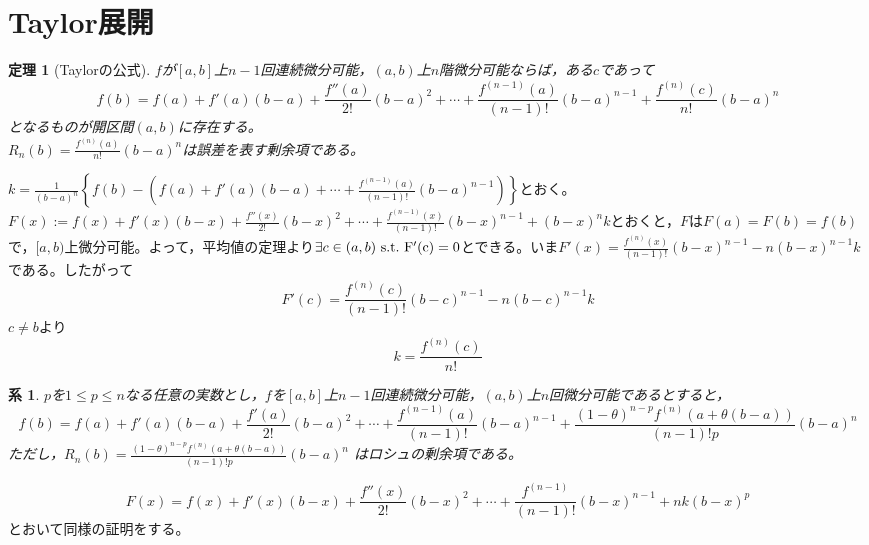 \documentclass[dvipdfmx,a4j,10pt]{jsarticle}
\makeatletter
\theoremstyle{mystyle1}
\newtheorem{thm}[dfn]{定理}
\newtheorem{cor}[dfn]{系}
\theoremstyle{mystyle2}
\renewenvironment{proof}[1][\proofname]{\par
  \pushQED{\qed}%
  \normalfont
  \topsep6\p@\@plus6\p@ \trivlist
  \item[\hskip\labelsep{\bfseries\sffamily #1}]\ignorespaces
}{%
  \popQED\endtrivlist\@endpefalse
}
\renewcommand\proofname{証明}
\makeatother
\begin{document}
\newpage

\section{Taylor展開}

\begin{framed}
\begin{thm}[Taylorの公式]\label{thm8.1}
$f$が$[a,b]$上$n-1$回連続微分可能，$(a,b)$上$n$階微分可能ならば，ある$c$であって
\[
f(b)=f(a)+f'(a)(b-a)+\frac{f''(a)}{2!}(b-a)^2+\cdots+\frac{f^{(n-1)}(a)}{(n-1)!}(b-a)^{n-1}+\frac{f^{(n)}(c)}{n!}(b-a)^n
\]
となるものが開区間$(a,b)$に存在する。\\
$\displaystyle R_n(b)= \frac{f^{(n)}(a)}{n!}(b-a)^n $は誤差を表す剰余項である。
\end{thm}
\end{framed}

\begin{proof}[定理\ref{thm8.1}の証明]
    $\displaystyle k=\frac{1}{(b-a)^n}\left\{f(b)-\left(f(a)+f'(a)(b-a)+\cdots+\frac{f^{(n-1)}(a)}{(n-1)!}(b-a)^{n-1}\right)\right\}$とおく。$\displaystyle F(x):=f(x)+f'(x)(b-x)+\frac{f''(x)}{2!}(b-x)^2+\cdots+\frac{f^{(n-1)}(x)}{(n-1)!}(b-x)^{n-1}+(b-x)^nk$とおくと，$F$は$F(a)=F(b)=f(b)$で，$[a,b)$上微分可能。よって，平均値の定理より$\exists c\in (a,b)\rm{\ s.t.\ }F'(c)=0$とできる。いま$\displaystyle F'(x)=\frac{f^{(n)}(x)}{(n-1)!}(b-x)^{n-1}-n(b-x)^{n-1}k$である。したがって
    \[
    F'(c)=\frac{f^{(n)}(c)}{(n-1)!}(b-c)^{n-1}-n(b-c)^{n-1}k
    \]
    $c\neq b$より
    \[
    k=\frac{f^{(n)}(c)}{n!}
    \]
\end{proof}

\begin{framed}
    \begin{cor}\label{cor8.2}
        $p$を$1\leq p\leq n$なる任意の実数とし，$f$を$[a,b]$上$n-1$回連続微分可能，$(a,b)$上$n$回微分可能であるとすると，
        \[
        f(b)=f(a)+f'(a)(b-a)+\frac{f'(a)}{2!}(b-a)^2+\cdots+\frac{f^{(n-1)}(a)}{(n-1)!}(b-a)^{n-1}+\frac{(1-\theta)^{n-p}f^{(n)}(a+\theta(b-a))}{(n-1)!p}(b-a)^n
        \]
        ただし，$\displaystyle R_n(b)= \frac{(1-\theta)^{n-p}f^{(n)}(a+\theta(b-a))}{(n-1)!p}(b-a)^n $
        はロシュの剰余項である。
    \end{cor}
\end{framed}

\begin{proof}[系\ref{cor8.2}の証明]
\[
F(x)=f(x)+f'(x)(b-x)+\frac{f''(x)}{2!}(b-x)^2+\cdots+\frac{f^{(n-1)}}{(n-1)!}(b-x)^{n-1}+nk(b-x)^p
\]
とおいて同様の証明をする。
\end{proof}
\end{document}

